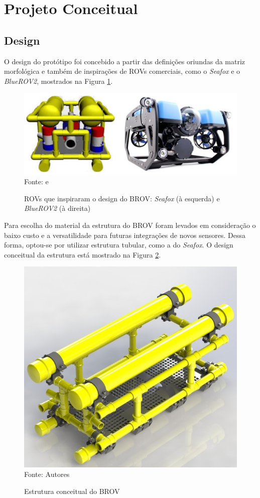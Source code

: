 \section{Projeto Conceitual}
\label{sec:projeto-conceitual}

\subsection{Design}
\label{subsec:design}
O design do protótipo foi concebido a partir das definições oriundas da matriz morfológica e também de inspirações de ROVs comerciais, como o \textit{Seafox} e o \textit{BlueROV2}, mostrados na Figura \ref{fig:seafoxbluerov2}.

\begin{figure}[h]
	\centering
	\caption[ROVs que inspiraram o design do BROV]{ROVs que inspiraram o design do BROV: \textit{Seafox} (à esquerda) e \textit{BlueROV2} (à direita)}
	\label{fig:seafoxbluerov2}
	\includegraphics[width=0.8\linewidth]{images/seafox_bluerov2}\\
	\footnotesize Fonte: \cite{Rocha2014} e \cite{bluerov2}
	
\end{figure}

Para escolha do material da estrutura do BROV foram levados em consideração o baixo custo e a versatilidade para futuras integrações de novos sensores. Dessa forma, optou-se por utilizar estrutura tubular, como a do \textit{Seafox}. O design conceitual da estrutura está mostrado na Figura \ref{fig:brov-frame}.

\begin{figure}[h]
	\centering
	\caption{Estrutura conceitual do BROV}
	\label{fig:brov-frame}
	\includegraphics[width=0.7\linewidth]{images/brov-frame}\\
	\footnotesize Fonte: Autores
\end{figure}

